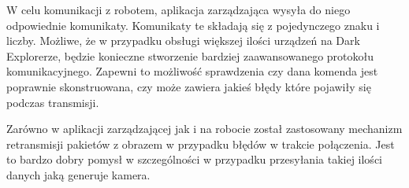 W celu komunikacji z robotem, aplikacja zarządzająca wysyła do niego odpowiednie
komunikaty. Komunikaty te składają się z pojedynczego znaku i liczby. Możliwe, że
w przypadku obsługi większej ilości urządzeń na Dark Explorerze, będzie konieczne
stworzenie bardziej zaawansowanego protokołu komunikacyjnego. Zapewni to
możliwość sprawdzenia czy dana komenda jest poprawnie skonstruowana, czy może
zawiera jakieś błędy które pojawiły się podczas transmisji.

Zarówno w aplikacji zarządzającej jak i na robocie został zastosowany mechanizm
retransmisji pakietów z obrazem w przypadku błędów w trakcie połączenia. Jest to
bardzo dobry pomysł w szczególności w przypadku przesyłania takiej ilości danych
jaką generuje kamera.

